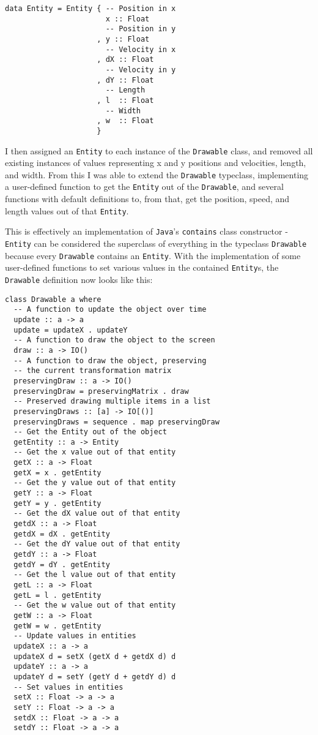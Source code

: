 \documentclass[12pt, a4paper]{report}
\begin{document}
\begin{lstlisting}
data Entity = Entity { -- Position in x
                       x :: Float
                       -- Position in y
                     , y :: Float
                       -- Velocity in x
                     , dX :: Float
                       -- Velocity in y
                     , dY :: Float
                       -- Length
                     , l  :: Float
                       -- Width
                     , w  :: Float
                     }
\end{lstlisting}

I then assigned an \verb|Entity| to each instance of the \verb|Drawable| class, and removed all existing instances of values representing x and y positions and velocities, length, and width.
From this I was able to extend the \verb|Drawable| typeclass, implementing a user-defined function to get the \verb|Entity| out of the \verb|Drawable|, and several functions with default definitions to, from that, get the position, speed, and length values out of that \verb|Entity|.

\par

This is effectively an implementation of \verb|Java|'s \verb|contains| class constructor - \verb|Entity| can be considered the superclass of everything in the typeclass \verb|Drawable| because every \verb|Drawable| contains an \verb|Entity|.
With the implementation of some user-defined functions to set various values in the contained \verb|Entity|s, the \verb|Drawable| definition now looks like this:

\begin{lstlisting}
class Drawable a where
  -- A function to update the object over time
  update :: a -> a
  update = updateX . updateY
  -- A function to draw the object to the screen
  draw :: a -> IO()
  -- A function to draw the object, preserving
  -- the current transformation matrix
  preservingDraw :: a -> IO()
  preservingDraw = preservingMatrix . draw
  -- Preserved drawing multiple items in a list
  preservingDraws :: [a] -> IO[()]
  preservingDraws = sequence . map preservingDraw
  -- Get the Entity out of the object
  getEntity :: a -> Entity
  -- Get the x value out of that entity
  getX :: a -> Float
  getX = x . getEntity
  -- Get the y value out of that entity
  getY :: a -> Float
  getY = y . getEntity
  -- Get the dX value out of that entity
  getdX :: a -> Float
  getdX = dX . getEntity
  -- Get the dY value out of that entity
  getdY :: a -> Float
  getdY = dY . getEntity
  -- Get the l value out of that entity
  getL :: a -> Float
  getL = l . getEntity
  -- Get the w value out of that entity
  getW :: a -> Float
  getW = w . getEntity
  -- Update values in entities
  updateX :: a -> a
  updateX d = setX (getX d + getdX d) d
  updateY :: a -> a
  updateY d = setY (getY d + getdY d) d
  -- Set values in entities
  setX :: Float -> a -> a
  setY :: Float -> a -> a
  setdX :: Float -> a -> a
  setdY :: Float -> a -> a
\end{lstlisting}
\end{document}
